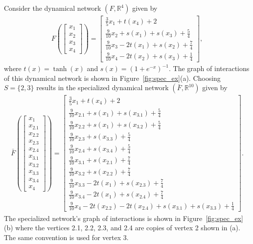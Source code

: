 \documentclass[12pt]{thesis}
\begin{document}
\begin{example}\label{ex:spec}
Consider the dynamical network $(F,\mathbb{R}^4)$ given by
\begin{align*}
    F\left(\begin{bmatrix}
    x_1 \\
    x_2 \\
    x_3 \\
    x_4
    \end{bmatrix}\right)
    =
    \begin{bmatrix}
    \frac{3}{5}x_1 + t(x_4) + 2 \\
    \frac{9}{10}x_2 + s(x_1) + s(x_3) + \frac{5}{4} \\
     \frac{9}{10}x_3-2t(x_1) + s(x_2) + \frac{7}{4} \\
     \frac{9}{10}x_4-2t(x_2) + s(x_3) + \frac{1}{4}
    \end{bmatrix},  
\end{align*}
where $t(x)=\tanh(x)$ and $s(x)=(1+ e^{-x})^{-1}$.
The graph of interactions of this dynamical network is shown in Figure~\ref{fig:spec_ex}(a).
Choosing $S=\{2,3\}$ results in the specialized dynamical network  $(\bar{F},\mathbb{R}^{10})$ given by
\begin{align*}
    \bar{F}\left(\begin{bmatrix}
    x_1 \\
    x_{2.1} \\
    x_{2.2} \\
    x_{2.3} \\
    x_{2.4} \\
    x_{3.1} \\
    x_{3.2} \\
    x_{3.3} \\
    x_{3.4} \\
    x_4
    \end{bmatrix}\right)
    =
    \begin{bmatrix}
    \frac{3}{5}x_1 + t(x_4) + 2\\
    \frac{9}{10}x_{2.1} + s(x_1) + s(x_{3.1}) + \frac{5}{4} \\
    \frac{9}{10}x_{2.2} + s(x_1) + s(x_{3.2}) + \frac{5}{4} \\
    \frac{9}{10}x_{2.3} + s(x_{3.3}) + \frac{5}{4} \\
    \frac{9}{10}x_{2.4} + s(x_{3.4}) + \frac{5}{4} \\
    \frac{9}{10}x_{3.1} + s(x_{2.1}) + \frac{7}{4} \\
    \frac{9}{10}x_{3.2} + s(x_{2.2}) + \frac{7}{4} \\
    \frac{9}{10}x_{3.3} - 2t(x_1) + s(x_{2.3}) + \frac{7}{4} \\
    \frac{9}{10}x_{3.4} - 2t(x_1) + s(x_{2.4}) + \frac{7}{4} \\
    \frac{9}{10}x_4 - 2t(x_{2.2}) - 2t(x_{2.4}) + s(x_{3.1})  + s(x_{3.3}) + \frac{1}{4}
    \end{bmatrix}.
\end{align*}
The specialized network's graph of interactions is shown in Figure~\ref{fig:spec_ex}(b) where the vertices  2.1, 2.2, 2.3, and 2.4 are copies of vertex 2 shown in (a).
The same convention is used for vertex 3.


\end{example}
\end{document}
